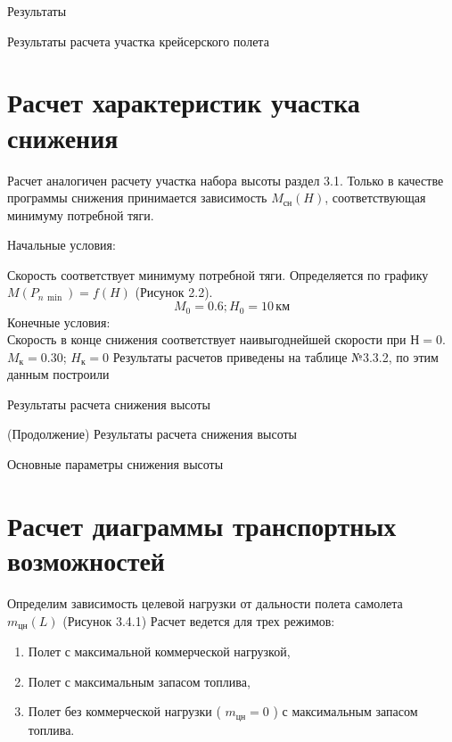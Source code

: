Результаты

\begin{table}[htpb]
    \centering
    \caption{Результаты расчета участка крейсерского полета}
    \label{tab:kr_flight}
    
\end{table}




\section{Расчет характеристик участка снижения}
Расчет аналогичен расчету участка набора высоты раздел 3.1.
Только в качестве программы снижения принимается зависимость $M_{сн}(H)$,
соответствующая минимуму потребной тяги.

Начальные условия:

Скорость соответствует минимуму потребной тяги. Определяется по графику
$M(P_{n\, \min})=f(H)$ (Рисунок 2.2).
\[
    M_0=0.6; H_0 = 10\, \text{км}
\]
Конечные условия:\\
Скорость в конце снижения соответствует наивыгоднейшей скорости при $Н=0$.
$M_к = 0.30$; $H_к = 0$
Результаты расчетов приведены на таблице №3.3.2, по этим данным построили

\begin{sidewaystable}[ph!]
    \centering
    \caption{Результаты расчета снижения высоты}
    \label{tab:result_descent}
    
    \centering
    \caption{(Продолжение) Результаты расчета снижения высоты}
    \label{tab:result_descent_2}
    
    \caption{Основные параметры снижения высоты}
    
    \label{tab:minitable_descent}
\end{sidewaystable}
\newpage

\section{Расчет диаграммы транспортных возможностей}
Определим зависимость целевой нагрузки от дальности полета самолета
$m_{цн}(L)$ (Рисунок 3.4.1)
Расчет ведется для трех режимов:
\begin{enumerate}
    \item Полет с максимальной коммерческой нагрузкой,
    \item Полет с максимальным запасом топлива,
    \item Полет без коммерческой нагрузки ( $m_{цн}=0$ ) с максимальным запасом топлива.
\end{enumerate}

